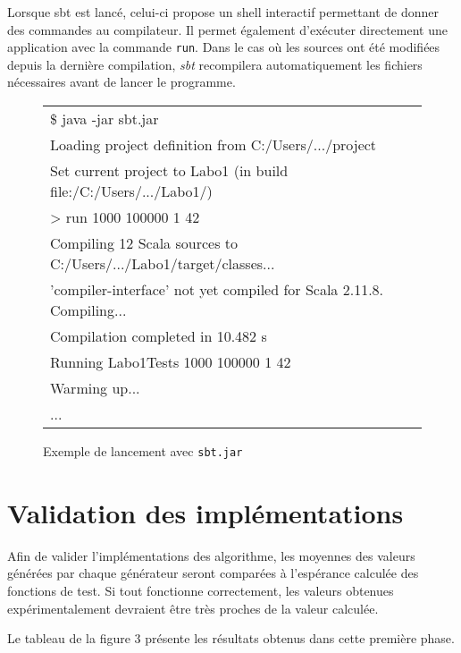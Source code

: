 \documentclass[a4paper,11pt]{article}
\begin{document}
Lorsque sbt est lancé, celui-ci propose un shell interactif permettant de donner des commandes au compilateur. Il permet également d'exécuter directement une application avec la commande \texttt{run}. Dans le cas où les sources ont été modifiées depuis la dernière compilation, \emph{sbt} recompilera automatiquement les fichiers nécessaires avant de lancer le programme.

\begin{figure}[h]
\begin{tabular}{l}
	\hline
	{\ttfamily \$ java -jar sbt.jar}\\
	{\ttfamily [info] Loading project definition from C:/Users/.../project}\\
	{\ttfamily [info] Set current project to Labo1 (in build file:/C:/Users/.../Labo1/)}\\
	{\ttfamily > run 1000 100000 1 42}\\
	{\ttfamily [info] Compiling 12 Scala sources to C:/Users/.../Labo1/target/classes...}\\
	{\ttfamily [info] 'compiler-interface' not yet compiled for Scala 2.11.8. Compiling...}\\
	{\ttfamily [info]   Compilation completed in 10.482 s}\\
	{\ttfamily [info] Running Labo1Tests 1000 100000 1 42}\\
	{\ttfamily Warming up...}\\
	{\ttfamily ...}\\
	\hline
\end{tabular}
\caption{Exemple de lancement avec \texttt{sbt.jar}}
\end{figure}

\section{Validation des implémentations}

Afin de valider l'implémentations des algorithme, les moyennes des valeurs générées par chaque générateur seront comparées à l'espérance calculée des fonctions de test. Si tout fonctionne correctement, les valeurs obtenues expérimentalement devraient être très proches de la valeur calculée.

Le tableau de la figure 3 présente les résultats obtenus dans cette première phase.
\end{document}
